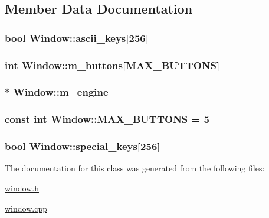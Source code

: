 \subsection{Member Data Documentation}
\hypertarget{classWindow_a821f2d3494f4f8942eb9785a11cb53a3}{
\subsubsection[{ascii\-\_\-keys}]{\setlength{\rightskip}{0pt plus 5cm}bool Window\-::ascii\-\_\-keys\mbox{[}256\mbox{]}\hspace{0.3cm}{\ttfamily [private]}}}\label{classWindow_a821f2d3494f4f8942eb9785a11cb53a3}
\hypertarget{classWindow_adf12eb74f1a9eb60cf9dd9e95ad73e07}{
\subsubsection[{m\-\_\-buttons}]{\setlength{\rightskip}{0pt plus 5cm}int Window\-::m\-\_\-buttons\mbox{[}{\bf M\-A\-X\-\_\-\-B\-U\-T\-T\-O\-N\-S}\mbox{]}\hspace{0.3cm}{\ttfamily [private]}}}\label{classWindow_adf12eb74f1a9eb60cf9dd9e95ad73e07}
\hypertarget{classWindow_ac9461ed7e87d19ee881a582909f7229b}{
\subsubsection[{m\-\_\-engine}]{$\ast$ Window\-::m\-\_\-engine\hspace{0.3cm}{\ttfamily [private]}}}\label{classWindow_ac9461ed7e87d19ee881a582909f7229b}
\hypertarget{classWindow_a78a36ba2259fdd12ad2cf3346430fb35}{
\subsubsection[{M\-A\-X\-\_\-\-B\-U\-T\-T\-O\-N\-S}]{\setlength{\rightskip}{0pt plus 5cm}const int Window\-::\-M\-A\-X\-\_\-\-B\-U\-T\-T\-O\-N\-S = 5\hspace{0.3cm}{\ttfamily [static]}}}\label{classWindow_a78a36ba2259fdd12ad2cf3346430fb35}
\hypertarget{classWindow_aa0423e0229d8bfadfdb48dfc353a1f14}{
\subsubsection[{special\-\_\-keys}]{\setlength{\rightskip}{0pt plus 5cm}bool Window\-::special\-\_\-keys\mbox{[}256\mbox{]}\hspace{0.3cm}{\ttfamily [private]}}}\label{classWindow_aa0423e0229d8bfadfdb48dfc353a1f14}


The documentation for this class was generated from the following files\-:\begin{DoxyCompactItemize}
\item 
\hyperlink{window_8h}{window.\-h}\item 
\hyperlink{window_8cpp}{window.\-cpp}\end{DoxyCompactItemize}
